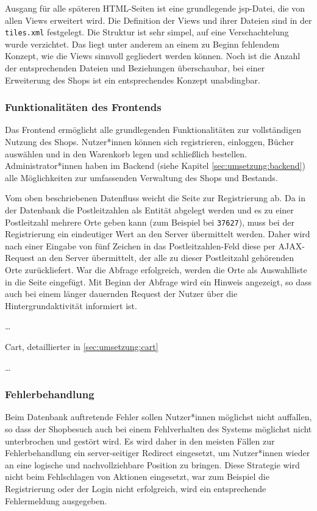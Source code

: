 		Ausgang für alle späteren HTML-Seiten ist eine grundlegende jsp-Datei, die von allen Views erweitert wird. Die Definition der Views und ihrer Dateien sind in der \lstinline|tiles.xml| festgelegt. Die Struktur ist sehr simpel, auf eine Verschachtelung wurde verzichtet. Das liegt unter anderem an einem zu Beginn fehlendem Konzept, wie die Views sinnvoll gegliedert werden können. Noch ist die Anzahl der entsprechenden Dateien und Beziehungen überschaubar, bei einer Erweiterung des Shops ist ein entsprechendes Konzept unabdingbar.
		
		\subsubsection{Funktionalitäten des Frontends}
		Das Frontend ermöglicht alle grundlegenden Funktionalitäten zur vollständigen Nutzung des Shops. Nutzer*innen können sich registrieren, einloggen, Bücher auswählen und in den Warenkorb legen und schließlich bestellen. Administrator*innen haben im Backend (siehe Kapitel \ref{sec:umsetzung:backend}) alle Möglichkeiten zur umfassenden Verwaltung des Shops und Bestands.
		
		Vom oben beschriebenen Datenfluss weicht die Seite zur Registrierung ab. Da in der Datenbank die Postleitzahlen als Entität abgelegt werden und es zu einer Postleitzahl mehrere Orte geben kann (zum Beispiel bei \lstinline|37627|), muss bei der Registrierung ein eindeutiger Wert an den Server übermittelt werden. Daher wird nach einer Eingabe von fünf Zeichen in das Postleitzahlen-Feld diese per AJAX-Request an den Server übermittelt, der alle zu dieser Postleitzahl gehörenden Orte zurückliefert. War die Abfrage erfolgreich, werden die Orte als Auswahlliste in die Seite eingefügt. Mit Beginn der Abfrage wird ein Hinweis angezeigt, so dass auch bei einem länger dauernden Request der Nutzer über die Hintergrundaktivität informiert ist.
		
		\dots
		
		Cart, detaillierter in \ref{sec:umsetzung:cart}
		
		\dots
		
		\subsubsection{Fehlerbehandlung}
		Beim Datenbank auftretende Fehler sollen Nutzer*innen möglichst nicht auffallen, so dass der Shopbesuch auch bei einem Fehlverhalten des Systems möglichst nicht unterbrochen und gestört wird. Es wird daher in den meisten Fällen zur Fehlerbehandlung ein server-seitiger Redirect eingesetzt, um Nutzer*innen wieder an eine logische und nachvollziehbare Position zu bringen. Diese Strategie wird nicht beim Fehlschlagen von Aktionen eingesetzt, war zum Beispiel die Registrierung oder der Login nicht erfolgreich, wird ein entsprechende Fehlermeldung ausgegeben.
		
